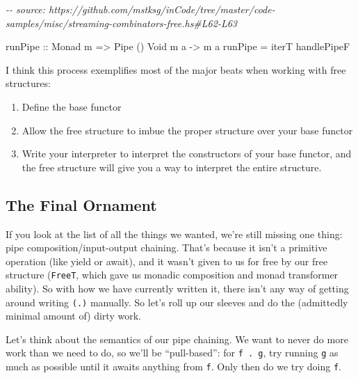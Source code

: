 \documentclass[]{article}
\newenvironment{Shaded}{}{}
\newcommand{\CommentTok}[1]{\textcolor[rgb]{0.38,0.63,0.69}{\textit{#1}}}
\newcommand{\DataTypeTok}[1]{\textcolor[rgb]{0.56,0.13,0.00}{#1}}
\newcommand{\NormalTok}[1]{#1}
\newcommand{\OtherTok}[1]{\textcolor[rgb]{0.00,0.44,0.13}{#1}}
\begin{document}
\begin{Shaded}
\begin{Highlighting}[]
\CommentTok{{-}{-} source: https://github.com/mstksg/inCode/tree/master/code{-}samples/misc/streaming{-}combinators{-}free.hs\#L62{-}L63}

\OtherTok{runPipe ::} \DataTypeTok{Monad}\NormalTok{ m }\OtherTok{=\textgreater{}} \DataTypeTok{Pipe}\NormalTok{ () }\DataTypeTok{Void}\NormalTok{ m a }\OtherTok{{-}\textgreater{}}\NormalTok{ m a}
\NormalTok{runPipe }\OtherTok{=}\NormalTok{ iterT handlePipeF}
\end{Highlighting}
\end{Shaded}

I think this process exemplifies most of the major beats when working with free
structures:

\begin{enumerate}
\def\labelenumi{\arabic{enumi}.}
\tightlist
\item
  Define the base functor
\item
  Allow the free structure to imbue the proper structure over your base functor
\item
  Write your interpreter to interpret the constructors of your base functor, and
  the free structure will give you a way to interpret the entire structure.
\end{enumerate}

\subsection{The Final Ornament}\label{the-final-ornament}

If you look at the list of all the things we wanted, we're still missing one
thing: pipe composition/input-output chaining. That's because it isn't a
primitive operation (like yield or await), and it wasn't given to us for free by
our free structure (\texttt{FreeT}, which gave us monadic composition and monad
transformer ability). So with how we have currently written it, there isn't any
way of getting around writing \texttt{(.\textbar{})} manually. So let's roll up
our sleeves and do the (admittedly minimal amount of) dirty work.

Let's think about the semantics of our pipe chaining. We want to never do more
work than we need to do, so we'll be ``pull-based'': for
\texttt{f\ .\textbar{}\ g}, try running \texttt{g} as much as possible until it
awaits anything from \texttt{f}. Only then do we try doing \texttt{f}.
\end{document}
